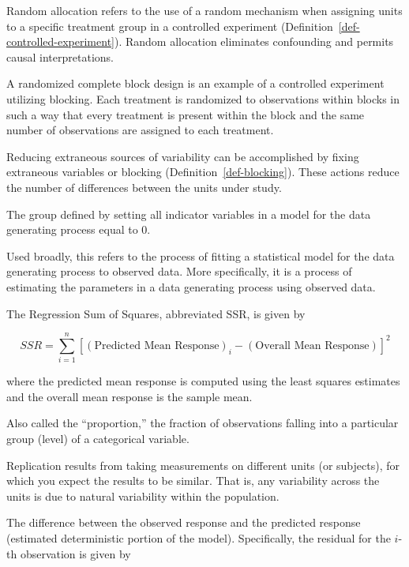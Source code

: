 \documentclass[
  letterpaper,
  DIV=11,
  numbers=noendperiod]{scrreprt}
\providecommand{\tightlist}{%
  \setlength{\itemsep}{0pt}\setlength{\parskip}{0pt}}\usepackage{longtable,booktabs,array}
\theoremstyle{definition}
\theoremstyle{definition}
\theoremstyle{plain}
\theoremstyle{remark}
\begin{document}
Random allocation refers to the use of a random mechanism when assigning
units to a specific treatment group in a controlled experiment
(Definition~\ref{def-controlled-experiment}). Random allocation
eliminates confounding and permits causal interpretations.

\begin{description}
\tightlist
\item[Randomized Complete Block Design (Definition~\ref{def-rcbd})]
A randomized complete block design is an example of a controlled
experiment utilizing blocking. Each treatment is randomized to
observations within blocks in such a way that every treatment is present
within the block and the same number of observations are assigned to
each treatment.
\item[Reduction of Noise (Definition~\ref{def-noise-reduction})]
Reducing extraneous sources of variability can be accomplished by fixing
extraneous variables or blocking (Definition~\ref{def-blocking}). These
actions reduce the number of differences between the units under study.
\item[Reference Group (Definition~\ref{def-reference-group})]
The group defined by setting all indicator variables in a model for the
data generating process equal to 0.
\item[Regression (Definition~\ref{def-regression})]
Used broadly, this refers to the process of fitting a statistical model
for the data generating process to observed data. More specifically, it
is a process of estimating the parameters in a data generating process
using observed data.
\item[Regression Sum of Squares (Definition~\ref{def-ssr})]
The Regression Sum of Squares, abbreviated SSR, is given by
\end{description}

\[SSR = \sum_{i=1}^{n} \left[(\text{Predicted Mean Response})_i - (\text{Overall Mean Response})\right]^2\]

where the predicted mean response is computed using the least squares
estimates and the overall mean response is the sample mean.

\begin{description}
\tightlist
\item[Relative Frequency (Definition~\ref{def-relative-frequency})]
Also called the ``proportion,'' the fraction of observations falling
into a particular group (level) of a categorical variable.
\item[Replication (Definition~\ref{def-replication})]
Replication results from taking measurements on different units (or
subjects), for which you expect the results to be similar. That is, any
variability across the units is due to natural variability within the
population.
\item[Residual (Definition~\ref{def-residual})]
The difference between the observed response and the predicted response
(estimated deterministic portion of the model). Specifically, the
residual for the \(i\)-th observation is given by
\end{description}
\end{document}
